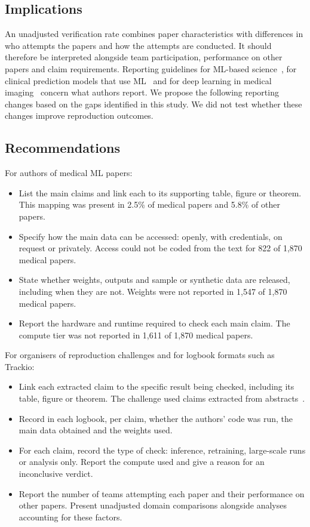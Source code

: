 \documentclass[11pt]{article}
\begin{document}
\subsection*{Implications}
An unadjusted verification rate combines paper characteristics with differences in who attempts the papers and how the attempts are conducted. It should therefore be interpreted alongside team participation, performance on other papers and claim requirements. Reporting guidelines for ML-based science~\cite{r15}, for clinical prediction models that use ML~\cite{r16} and for deep learning in medical imaging~\cite{r17} concern what authors report. We propose the following reporting changes based on the gaps identified in this study. We did not test whether these changes improve reproduction outcomes.

\subsection*{Recommendations}
For authors of medical ML papers:

\begin{itemize}
\item List the main claims and link each to its supporting table, figure or theorem. This mapping was present in 2.5\% of medical papers and 5.8\% of other papers.
\item Specify how the main data can be accessed: openly, with credentials, on request or privately. Access could not be coded from the text for 822 of 1,870 medical papers.
\item State whether weights, outputs and sample or synthetic data are released, including when they are not. Weights were not reported in 1,547 of 1,870 medical papers.
\item Report the hardware and runtime required to check each main claim. The compute tier was not reported in 1,611 of 1,870 medical papers.
\end{itemize}

For organisers of reproduction challenges and for logbook formats such as Trackio:

\begin{itemize}
\item Link each extracted claim to the specific result being checked, including its table, figure or theorem. The challenge used claims extracted from abstracts~\cite{r9}.
\item Record in each logbook, per claim, whether the authors' code was run, the main data obtained and the weights used.
\item For each claim, record the type of check: inference, retraining, large-scale runs or analysis only. Report the compute used and give a reason for an inconclusive verdict.
\item Report the number of teams attempting each paper and their performance on other papers. Present unadjusted domain comparisons alongside analyses accounting for these factors.
\end{itemize}
\end{document}
